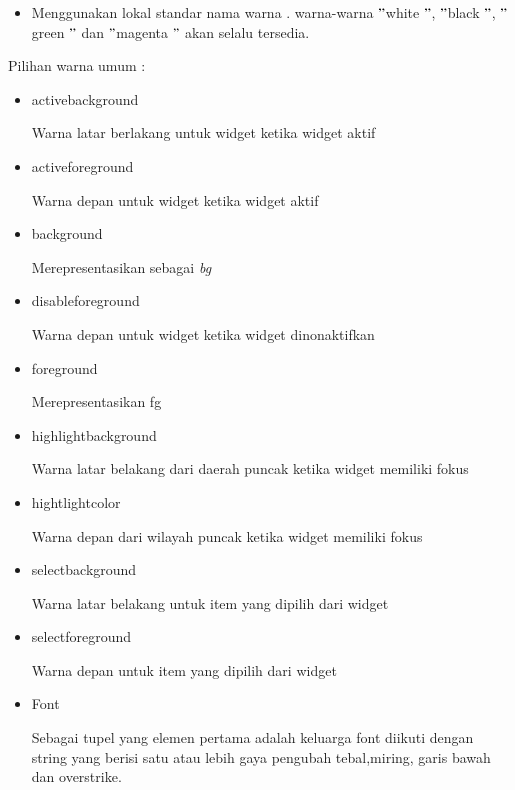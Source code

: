 \documentclass[a4paper,12pt]{report}
\begin{document}
\begin{myEnumerate}
\begin{itemize}
\noindent 
\item Menggunakan lokal standar nama warna . warna-warna  $ " $white $ " $, $ " $black $ " $,  $ " $green $ " $ dan  $ " $magenta $ " $ akan selalu tersedia.\end{itemize}
 \par
\vspace{12pt}
Pilihan warna umum : \par
\noindent 
\begin{itemize}
\item activebackground \par
Warna latar berlakang untuk widget ketika widget aktif \par
\noindent 
\item activeforeground \par
Warna depan untuk widget ketika widget aktif \par
\noindent 
\item background \par
Merepresentasikan sebagai \textit{bg} \par
\noindent 
\item disableforeground \par
Warna depan untuk widget ketika widget dinonaktifkan \par
\noindent 
\item foreground \par
Merepresentasikan fg \par
\noindent 
\item highlightbackground \par
Warna latar belakang dari daerah puncak ketika widget memiliki fokus \par
\noindent 
\item hightlightcolor \par
Warna depan dari wilayah puncak ketika widget memiliki fokus \par
\noindent 
\item selectbackground \par
Warna latar belakang untuk item yang dipilih dari widget \par
\noindent 
\item selectforeground \par
Warna depan untuk item yang dipilih dari widget \par
\noindent 
\item Font \par
\noindent 
Sebagai tupel yang elemen pertama adalah keluarga font diikuti dengan string yang berisi satu atau lebih gaya pengubah tebal,miring, garis bawah dan overstrike. \par

\end{itemize}
\end{myEnumerate}
\end{document}
